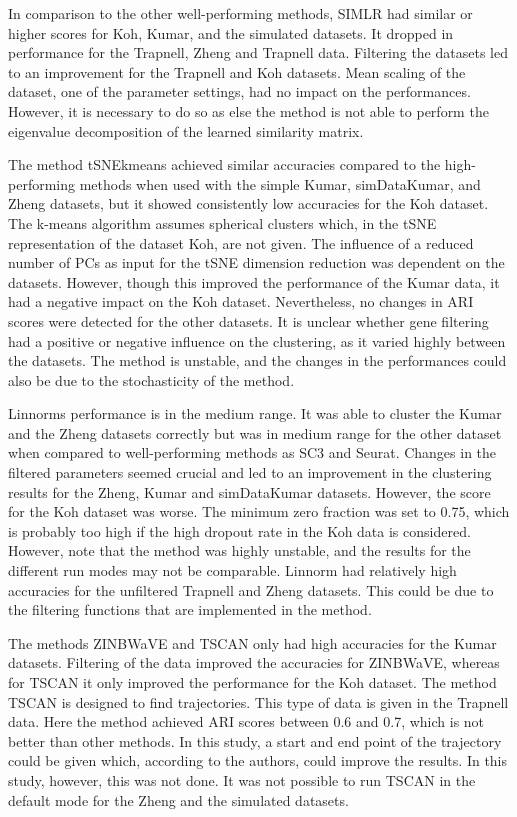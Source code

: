 \documentclass[12pt, a4paper]{article}\usepackage[]{graphicx}\usepackage[]{color}
\begin{document}
In comparison to the other well-performing methods, SIMLR had similar or higher scores for Koh, Kumar, and the simulated datasets. It dropped in performance for the Trapnell, Zheng and Trapnell data. Filtering the datasets led to an improvement for the Trapnell and Koh datasets. Mean scaling of the dataset, one of the parameter settings,  had no impact on the performances. However, it is necessary to do so as else the method is not able to perform the eigenvalue decomposition of the learned similarity matrix. 

The method tSNEkmeans achieved similar accuracies compared to the high-performing methods when used with the simple Kumar, simDataKumar, and Zheng datasets, but it showed consistently low accuracies for the Koh dataset. The k-means algorithm assumes spherical clusters which, in the tSNE representation of the dataset Koh, are not given. The influence of a reduced number of PCs as input for the tSNE dimension reduction was dependent on the datasets. However, though this improved the performance of the Kumar data, it had a negative impact on the Koh dataset. Nevertheless, no changes in ARI scores were detected for the other datasets. It is unclear whether gene filtering had a positive or negative influence on the clustering, as it varied highly between the datasets. The method is unstable, and the changes in the performances could also be due to the stochasticity of the method.

Linnorms performance is in the medium range. It was able to cluster the Kumar and the Zheng datasets correctly but was in medium range for the other dataset when compared to well-performing methods as SC3 and Seurat. Changes in the filtered parameters seemed crucial and led to an improvement in the clustering results for the Zheng, Kumar and simDataKumar datasets. However, the score for the Koh dataset was worse. The minimum zero fraction was set to 0.75, which is probably too high if the high dropout rate in the Koh data is considered. However, note that the method was highly unstable, and the results for the different run modes may not be comparable. Linnorm had relatively high accuracies for the unfiltered Trapnell and Zheng datasets. This could be due to the filtering functions that are implemented in the method.

The methods ZINBWaVE and TSCAN only had high accuracies for the Kumar datasets. Filtering of the data improved the accuracies for ZINBWaVE, whereas for TSCAN it only improved the performance for the Koh dataset. The method TSCAN is designed to find trajectories. This type of data is given in the Trapnell data. Here the method achieved ARI scores between 0.6 and 0.7, which is not better than other methods. In this study, a start and end point of the trajectory could be given which, according to the authors, could improve the results. In this study, however, this was not done. It was not possible to run TSCAN in the default mode for the Zheng and the simulated datasets. 
\end{document}

